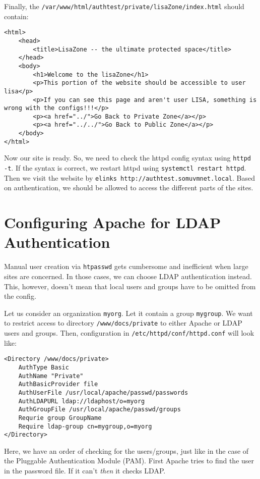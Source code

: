 \noindent
Finally, the \verb|/var/www/html/authtest/private/lisaZone/index.html| should contain:

\vspace{-15pt}
\begin{verbatim}
<html>
	<head>
		<title>LisaZone -- the ultimate protected space</title>
	</head>
	<body>
		<h1>Welcome to the lisaZone</h1>
		<p>This portion of the website should be accessible to user lisa</p>
		<p>If you can see this page and aren't user LISA, something is wrong with the configs!!!</p>
		<p><a href="../">Go Back to Private Zone</a></p>
		<p><a href="../../">Go Back to Public Zone</a></p>
	</body>
</html>
\end{verbatim}
\vspace{-10pt}	

\noindent
Now our site is ready. So, we need to check the httpd config syntax using \verb|httpd -t|. If the syntax is correct, we restart httpd using \verb|systemctl restart httpd|. Then we visit the website by \verb|elinks http://authtest.somuvmnet.local|. Based on authentication, we should be allowed to access the different parts of the sites. 

\section{Configuring Apache for LDAP Authentication}
Manual user creation via \verb|htpasswd| gets cumbersome and inefficient when large sites are concerned. In those cases, we can choose LDAP authentication instead. This, however, doesn't mean that local users and groups have to be omitted from the config. 

Let us consider an organization \verb|myorg|. Let it contain a group \verb|mygroup|. We want to restrict access to directory \verb|/www/docs/private| to either Apache or LDAP users and groups. Then, configuration in \verb|/etc/httpd/conf/httpd.conf| will look like:

\vspace{-15pt}
\begin{verbatim}
<Directory /www/docs/private>
	AuthType Basic
	AuthName "Private"
	AuthBasicProvider file
	AuthUserFile /usr/local/apache/passwd/passwords
	AuthLDAPURL ldap://ldaphost/o=myorg
	AuthGroupFile /usr/local/apache/passwd/groups
	Requrie group GroupName
	Require ldap-group cn=mygroup,o=myorg
</Directory>
\end{verbatim}
\vspace{-10pt}	

\noindent
Here, we have an order of checking for the users/groups, just like in the case of the Pluggable Authentication Module (PAM). First Apache tries to find the user in the password file. If it can't \textit{then} it checks LDAP.

